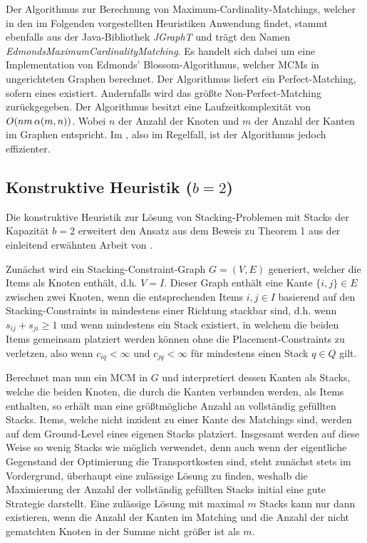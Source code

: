 Der Algorithmus zur Berechnung von Maximum-Cardinality-Matchings, welcher in den im Folgenden
vorgestellten Heuristiken Anwendung findet, stammt ebenfalls aus der Java-Bibliothek \textit{JGraphT} \cite{JGraphT} und trägt
den Namen \textit{EdmondsMaximumCardinalityMatching}. Es handelt sich dabei um eine Implementation von Edmonds' Blossom-Algorithmus,
welcher MCMs in ungerichteten Graphen berechnet. Der Algorithmus liefert ein Perfect-Matching, sofern eines existiert.
Andernfalls wird das größte Non-Perfect-Matching zurückgegeben.
Der Algorithmus besitzt eine Laufzeitkomplexität von $O(nm \thinspace \alpha(m, n))$. Wobei $n$ der Anzahl der Knoten
und $m$ der Anzahl der Kanten im Graphen entspricht. Im , also im Regelfall, ist der Algorithmus jedoch effizienter.

\subsection{Konstruktive Heuristik ($b = 2$)}
\label{sec:two_cap_heuristic}

Die konstruktive Heuristik zur Lösung von Stacking-Problemen mit Stacks der Kapazität $b=2$ erweitert den Ansatz aus dem Beweis
zu Theorem 1 aus der einleitend erwähnten Arbeit von \citet{Bruns2015}.

Zunächst wird ein Stacking-Constraint-Graph $G = (V, E)$ generiert, welcher die Items als Knoten enthält, d.h. $V = I$. Dieser Graph
enthält eine Kante $\{i, j\} \in E$ zwischen zwei Knoten, wenn die entsprechenden Items $i, j \in I$ basierend auf den Stacking-Constraints
in mindestens einer Richtung stackbar sind, d.h. wenn $s_{ij} + s_{ji} \geq 1$ und wenn mindestens ein Stack existiert, in welchem die beiden Items gemeinsam platziert werden können ohne die Placement-Constraints zu verletzen, also wenn $c_{iq} < \infty$ und $c_{jq} < \infty$ für
mindestens einen Stack $q \in Q$ gilt.

Berechnet man nun ein \textsc{MCM} in $G$ und interpretiert dessen Kanten als Stacks, welche die beiden Knoten, die durch
die Kanten verbunden werden, als Items enthalten, so erhält man eine größtmögliche Anzahl an vollständig gefüllten Stacks.
Items, welche nicht inzident zu einer Kante des Matchings sind, werden auf dem Ground-Level eines eigenen Stacks platziert.
Insgesamt werden auf diese Weise so wenig Stacks wie möglich verwendet, denn auch wenn der eigentliche Gegenstand der Optimierung die Transportkosten sind, steht zunächst stets im Vordergrund, überhaupt eine zulässige Lösung zu finden, weshalb die Maximierung der Anzahl der vollständig gefüllten Stacks initial eine gute Strategie darstellt.
Eine zulässige Lösung mit maximal $m$ Stacks kann nur dann existieren, wenn die Anzahl der Kanten im Matching und die Anzahl der nicht gematchten Knoten in der Summe nicht größer ist als $m$.

